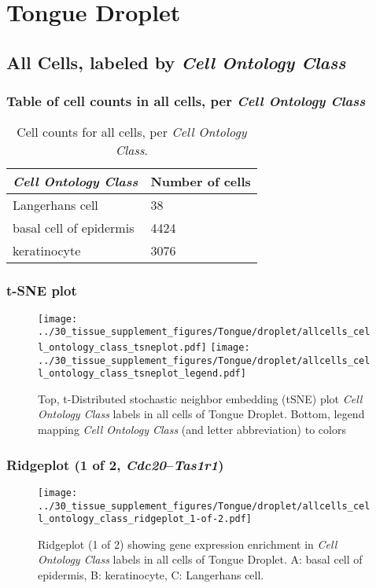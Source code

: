 \clearpage
\section{Tongue Droplet}

\subsection{All Cells, labeled by \emph{Cell Ontology Class}}
\subsubsection{Table of cell counts in all cells, per \emph{Cell Ontology Class}}\begin{table}[h]
\centering
\label{my-label}
\begin{tabular}{@{}ll@{}}
\toprule

\emph{Cell Ontology Class}& Number of cells \\ \midrule
Langerhans cell & 38 \\

basal cell of epidermis & 4424 \\

keratinocyte & 3076 \\
\bottomrule
\end{tabular}
\caption{Cell counts for all cells, per \emph{Cell Ontology Class}.}
\end{table}

\clearpage
\subsubsection{t-SNE plot}
\begin{figure}[h]
\centering
\texttt{[image: ../30\_tissue\_supplement\_figures/Tongue/droplet/allcells\_cell\_ontology\_class\_tsneplot.pdf]}
\texttt{[image: ../30\_tissue\_supplement\_figures/Tongue/droplet/allcells\_cell\_ontology\_class\_tsneplot\_legend.pdf]}
\caption{Top, t-Distributed stochastic neighbor embedding (tSNE) plot  \emph{Cell Ontology Class} labels in all cells of Tongue Droplet. Bottom, legend mapping \emph{Cell Ontology Class} (and letter abbreviation) to colors}
\end{figure}


\clearpage

\subsubsection{Ridgeplot (1 of 2, \emph{Cdc20}--\emph{Tas1r1})}
\begin{figure}[h]
\centering
\texttt{[image: ../30\_tissue\_supplement\_figures/Tongue/droplet/allcells\_cell\_ontology\_class\_ridgeplot\_1-of-2.pdf]}

\caption{ Ridgeplot (1 of 2)  showing gene expression enrichment in \emph{Cell Ontology Class} labels in all cells of Tongue Droplet. A: basal cell of epidermis, B: keratinocyte, C: Langerhans cell.}
\end{figure}


